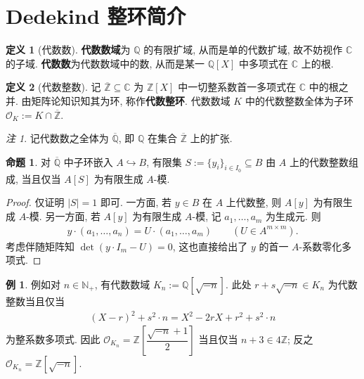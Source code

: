 \documentclass{MainStyle}
\theoremstyle{definition}
\newtheorem{example}{例}
\theoremstyle{definition}
\theoremstyle{definition}
\newtheorem{definition}{定义}
\theoremstyle{definition}
\newtheorem{proposition}{命题}
\theoremstyle{definition}
\theoremstyle{definition}
\theoremstyle{definition}
\theoremstyle{remark}
\newtheorem{remark}{注}
\theoremstyle{remark}
\begin{document}
\maketitle
\tableofcontents
\section{Dedekind 整环简介}

\begin{definition}[代数数]
    \textbf{代数数域}为 $\mathbb Q$ 的有限扩域, 从而是单的代数扩域, 故不妨视作 $\mathbb C$ 的子域. \textbf{代数数}为代数数域中的数, 从而是某一 $\mathbb Q[X]$ 中多项式在 $\mathbb C$ 上的根.
\end{definition}

\begin{definition}[代数整数]
    记 $\overline{\mathbb Z}\subseteq \mathbb C$ 为 $\mathbb Z[X]$ 中一切整系数首一多项式在 $\mathbb C$ 中的根之并. 由矩阵论知识知其为环, 称作\textbf{代数整环}. 代数数域 $K$ 中的代数整数全体为子环 $\mathcal O_K:=K\cap \overline{\mathbb Z}$.
\end{definition}

\begin{remark}
    记代数数之全体为 $\overline{\mathbb Q}$, 即 $\mathbb Q$ 在集合 $\overline{\mathbb Z}$ 上的扩张.
\end{remark}

\begin{proposition}
    对 $\overline{\mathbb Q}$ 中子环嵌入 $A\hookrightarrow B$, 有限集 $S:=\{y_i\}_{i\in I_0}\subseteq B$ 由 $A$ 上的代数整数组成, 当且仅当 $A[S]$ 为有限生成 $A$-模.
    \begin{proof}
        仅证明 $|S|=1$ 即可. 一方面, 若 $y\in B$ 在 $A$ 上代数整, 则 $A[y]$ 为有限生成 $A$-模. 另一方面, 若 $A[y]$ 为有限生成 $A$-模, 记 $a_1,\ldots, a_m$ 为生成元. 则
        \begin{align*}
            y\cdot (a_1,\ldots, a_n)=U\cdot (a_1,\ldots, a_m)\qquad (U\in A^{m\times m}).
        \end{align*}
        考虑伴随矩阵知 $\det(y\cdot I_m-U)=0$, 这也直接给出了 $y$ 的首一 $A$-系数零化多项式.
    \end{proof}
\end{proposition}

\begin{example}
    例如对 $n\in \mathbb N_+$, 有代数数域 $K_n:=\mathbb Q[\sqrt{-n}]$. 此处 $r+s\sqrt{-n}\in K_n$ 为代数整数当且仅当
    \begin{align*}
        (X-r)^2+s^2\cdot n=X^2-2rX+r^2+s^2\cdot n
    \end{align*}
    为整系数多项式. 因此 $\mathcal O_{K_n}=\mathbb Z\left[\dfrac{\sqrt{-n}+1}{2}\right]$ 当且仅当 $n+3\in 4\mathbb Z$; 反之 $\mathcal O_{K_n}=\mathbb Z[\sqrt{-n}]$.
\end{example}
\end{document}
